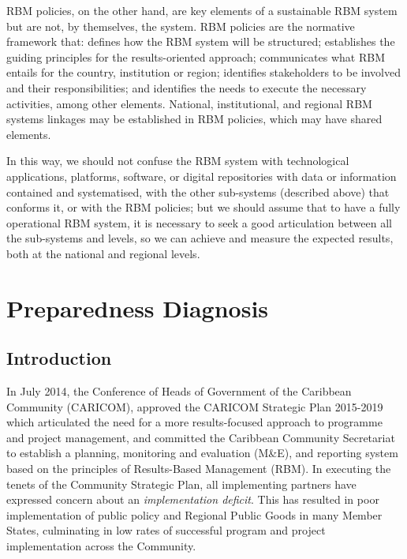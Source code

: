 \documentclass[
  10pt,
]{book}
\begin{document}
RBM policies, on the other hand, are key elements of a sustainable RBM system but are not, by themselves, the system. RBM policies are the normative framework that: defines how the RBM system will be structured; establishes the guiding principles for the results-oriented approach; communicates what RBM entails for the country, institution or region; identifies stakeholders to be involved and their responsibilities; and identifies the needs to execute the necessary activities, among other elements. National, institutional, and regional RBM systems linkages may be established in RBM policies, which may have shared elements.

In this way, we should not confuse the RBM system with technological applications, platforms, software, or digital repositories with data or information contained and systematised, with the other sub-systems (described above) that conforms it, or with the RBM policies; but we should assume that to have a fully operational RBM system, it is necessary to seek a good articulation between all the sub-systems and levels, so we can achieve and measure the expected results, both at the national and regional levels.

\hypertarget{part-preparedness-diagnosis}{%
\part{Preparedness Diagnosis}\label{part-preparedness-diagnosis}}

\hypertarget{introduction}{%
\chapter{Introduction}\label{introduction}}

In July 2014, the Conference of Heads of Government of the Caribbean Community (CARICOM), approved the CARICOM Strategic Plan 2015-2019 which articulated the need for a more results-focused approach to programme and project management, and committed the Caribbean Community Secretariat to establish a planning, monitoring and evaluation (M\&E), and reporting system based on the principles of Results-Based Management (RBM). In executing the tenets of the Community Strategic Plan, all implementing partners have expressed concern about an \emph{implementation deficit}. This has resulted in poor implementation of public policy and Regional Public Goods in many Member States, culminating in low rates of successful program and project implementation across the Community.
\end{document}
